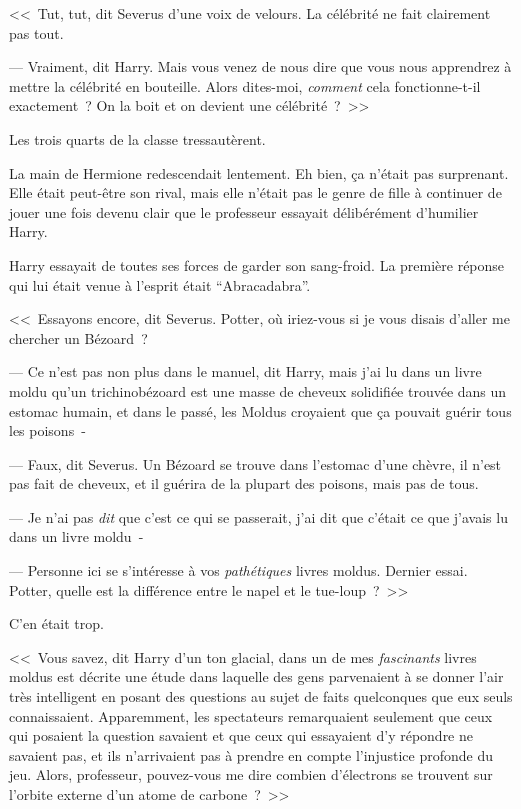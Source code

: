 <<~Tut, tut, dit Severus d'une voix de velours. La célébrité ne fait clairement pas tout.

--- Vraiment, dit Harry. Mais vous venez de nous dire que vous nous apprendrez à mettre la célébrité en bouteille. Alors dites-moi, \emph{comment} cela fonctionne-t-il exactement~? On la boit et on devient une célébrité~?~>>

Les trois quarts de la classe tressautèrent.

La main de Hermione redescendait lentement. Eh bien, ça n'était pas surprenant. Elle était peut-être son rival, mais elle n'était pas le genre de fille à continuer de jouer une fois devenu clair que le professeur essayait délibérément d'humilier Harry.

Harry essayait de toutes ses forces de garder son sang-froid. La première réponse qui lui était venue à l'esprit était “Abracadabra”.

<<~Essayons encore, dit Severus. Potter, où iriez-vous si je vous disais d'aller me chercher un Bézoard~?

--- Ce n'est pas non plus dans le manuel, dit Harry, mais j'ai lu dans un livre moldu qu'un trichinobézoard est une masse de cheveux solidifiée trouvée dans un estomac humain, et dans le passé, les Moldus croyaient que ça pouvait guérir tous les poisons~-

--- Faux, dit Severus. Un Bézoard se trouve dans l'estomac d'une chèvre, il n'est pas fait de cheveux, et il guérira de la plupart des poisons, mais pas de tous.

--- Je n'ai pas \emph{dit} que c'est ce qui se passerait, j'ai dit que c'était ce que j'avais lu dans un livre moldu~-

--- Personne ici se s'intéresse à vos \emph{pathétiques} livres moldus. Dernier essai. Potter, quelle est la différence entre le napel et le tue-loup~?~>>

C'en était trop.

<<~Vous savez, dit Harry d'un ton glacial, dans un de mes \emph{fascinants} livres moldus est décrite une étude dans laquelle des gens parvenaient à se donner l'air très intelligent en posant des questions au sujet de faits quelconques que eux seuls connaissaient. Apparemment, les spectateurs remarquaient seulement que ceux qui posaient la question savaient et que ceux qui essayaient d'y répondre ne savaient pas, et ils n'arrivaient pas à prendre en compte l'injustice profonde du jeu. Alors, professeur, pouvez-vous me dire combien d'électrons se trouvent sur l'orbite externe d'un atome de carbone~?~>>

